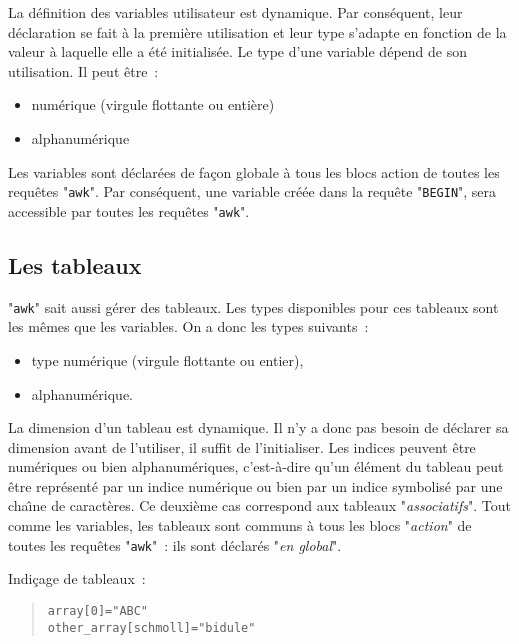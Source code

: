 La d{\'e}finition des variables utilisateur est dynamique. Par cons{\'e}quent, leur
d{\'e}claration se fait {\`a} la premi{\`e}re utilisation et leur type s'adapte en fonction
de la valeur {\`a} laquelle elle a {\'e}t{\'e} initialis{\'e}e. Le type d'une variable d{\'e}pend de
son utilisation. Il peut {\^e}tre~:
\begin{itemize}
	\item	num{\'e}rique (virgule flottante ou enti{\`e}re)
	\item	alphanum{\'e}rique
\end{itemize}

Les variables sont d{\'e}clar{\'e}es de fa\c{c}on globale {\`a} tous les blocs action de toutes
les requ{\^e}tes "\texttt{awk}". Par cons{\'e}quent, une variable cr{\'e}{\'e}e dans la requ{\^e}te
"\texttt{BEGIN}", sera accessible par toutes les requ{\^e}tes "\texttt{awk}".


\subsection{Les tableaux}

"\texttt{awk}" sait aussi g{\'e}rer des
tableaux. Les types disponibles pour ces tableaux sont les m{\^e}mes que les
variables. On a donc les types suivants~:
\begin{itemize}
	\item	type num{\'e}rique (virgule flottante ou entier),
	\item	alphanum{\'e}rique.
\end{itemize}

La dimension d'un tableau est dynamique. Il n'y a donc pas besoin de d{\'e}clarer
sa dimension  avant de l'utiliser, il suffit de l'initialiser. Les indices
peuvent {\^e}tre num{\'e}riques ou bien alphanum{\'e}riques, c'est-{\`a}-dire
qu'un {\'e}l{\'e}ment du tableau peut {\^e}tre repr{\'e}sent{\'e} par un indice
num{\'e}rique ou bien par un indice symbolis{\'e} par une cha{\^\i}ne de
caract{\`e}res. Ce deuxi{\`e}me cas correspond aux tableaux
"\textsl{associatifs}". Tout comme les variables, les tableaux sont communs
{\`a} tous les blocs "\textsl{action}" de toutes les requ{\^e}tes
"\texttt{awk}"~: ils sont d{\'e}clar{\'e}s "\textsl{en global}".

\begin{example}
Indi\c{c}age de tableaux~:
\begin{quote}
\begin{verbatim}
array[0]="ABC"
other_array[schmoll]="bidule"
\end{verbatim}
\end{quote}
\end{example}

